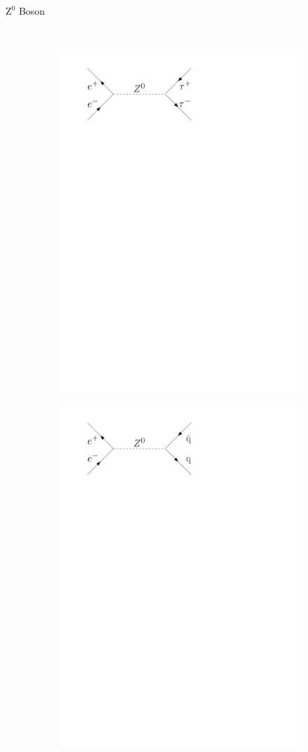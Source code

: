 \documentclass[11pt,xcolor=dvipsnames,professionalfonts]{beamer}
\begin{document}
\begin{frame}{$\mathrm{Z}^0$ Boson}
\begin{figure}[htb]
\begin{subfigure}{.28\textwidth}
		\end{subfigure}
		\\
		\vspace{1em}
		\begin{subfigure}{.28\textwidth}
			\centering
			\includegraphics[width=.8\textwidth]{./figures/theory/feynman/tt}
		\end{subfigure}
		\begin{subfigure}{.28\textwidth}
			\centering
			\includegraphics[width=.8\textwidth]{./figures/theory/feynman/qq}

\end{subfigure}
\end{figure}
\end{frame}
\end{document}
